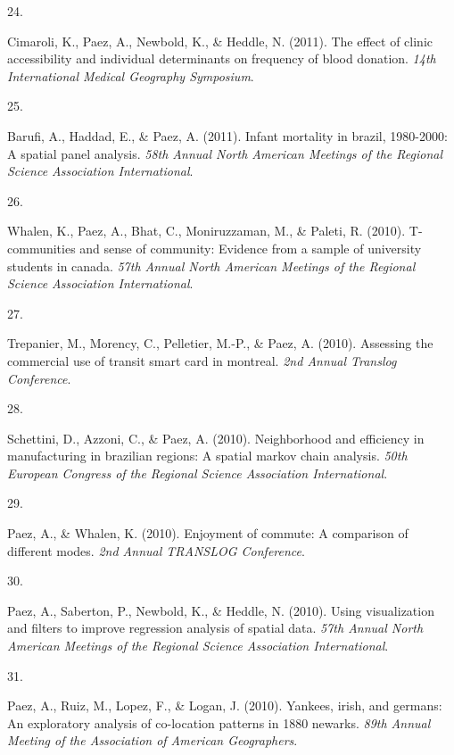 \documentclass[10pt,a4paper,]{twentysecondcv}
\newlength{\csllabelwidth}
\newcommand{\CSLLeftMargin}[1]{\parbox[t]{\csllabelwidth}{#1}}
\newcommand{\CSLRightInline}[1]{\parbox[t]{\linewidth - \csllabelwidth}{#1}}
\begin{document}
\leavevmode{}%
\CSLLeftMargin{24. }%
\CSLRightInline{Cimaroli, K., Paez, A., Newbold, K., \& Heddle, N.
(2011). The effect of clinic accessibility and individual determinants
on frequency of blood donation. \emph{14th International Medical
Geography Symposium}.}

\leavevmode{}%
\CSLLeftMargin{25. }%
\CSLRightInline{Barufi, A., Haddad, E., \& Paez, A. (2011). Infant
mortality in brazil, 1980-2000: A spatial panel analysis. \emph{58th
Annual North American Meetings of the Regional Science Association
International}.}

\leavevmode{}%
\CSLLeftMargin{26. }%
\CSLRightInline{Whalen, K., Paez, A., Bhat, C., Moniruzzaman, M., \&
Paleti, R. (2010). T-communities and sense of community: Evidence from a
sample of university students in canada. \emph{57th Annual North
American Meetings of the Regional Science Association International}.}

\leavevmode{}%
\CSLLeftMargin{27. }%
\CSLRightInline{Trepanier, M., Morency, C., Pelletier, M.-P., \& Paez,
A. (2010). Assessing the commercial use of transit smart card in
montreal. \emph{2nd Annual Translog Conference}.}

\leavevmode{}%
\CSLLeftMargin{28. }%
\CSLRightInline{Schettini, D., Azzoni, C., \& Paez, A. (2010).
Neighborhood and efficiency in manufacturing in brazilian regions: A
spatial markov chain analysis. \emph{50th European Congress of the
Regional Science Association International}.}

\leavevmode{}%
\CSLLeftMargin{29. }%
\CSLRightInline{Paez, A., \& Whalen, K. (2010). Enjoyment of commute: A
comparison of different modes. \emph{2nd Annual TRANSLOG Conference}.}

\leavevmode{}%
\CSLLeftMargin{30. }%
\CSLRightInline{Paez, A., Saberton, P., Newbold, K., \& Heddle, N.
(2010). Using visualization and filters to improve regression analysis
of spatial data. \emph{57th Annual North American Meetings of the
Regional Science Association International}.}

\leavevmode{}%
\CSLLeftMargin{31. }%
\CSLRightInline{Paez, A., Ruiz, M., Lopez, F., \& Logan, J. (2010).
Yankees, irish, and germans: An exploratory analysis of co-location
patterns in 1880 newarks. \emph{89th Annual Meeting of the Association
of American Geographers}.}
\end{document}
